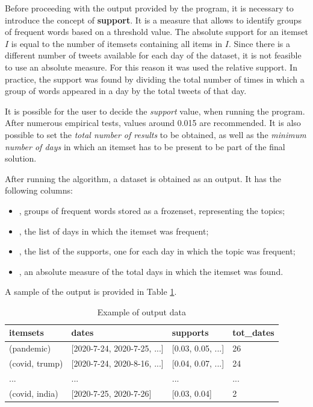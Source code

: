 Before proceeding with the output provided by the program, it is necessary to introduce the concept of \textbf{support}. It is a measure that allows to identify groups of frequent words based on a threshold value. The absolute support for an itemset $I$ is equal to the number of itemsets containing all items in $I$. Since there is a different number of tweets available for each day of the dataset, it is not feasible to use an absolute measure. For this reason it was used the relative support. In practice, the support was found by dividing the total number of times in which a group of words appeared in a day by the total tweets of that day. 

It is possible for the user to decide the \textit{support} value, when running the program. After numerous empirical tests, values around 0.015 are recommended. It is also possible to set the \textit{total number of results} to be obtained, as well as the \textit{minimum number of days} in which an itemset has to be present to be part of the final solution.

After running the algorithm, a dataset is obtained as an output. It has the following columns:

\begin{itemize}
  \item {}, groups of frequent words stored as a frozenset, representing the topics;
  \item {}, the list of days in which the itemset was frequent;
  \item {}, the list of the supports, one for each day in which the topic was frequent;
  \item {}, an absolute measure of the total days in which the itemset was found.
\end{itemize}

A sample of the output is provided in Table \ref{tab_output}.

\begin{table}[h]
  \centering
  \small
  \tabcolsep=0.14cm
  \begin{tabular}{@{}llll@{}}
  \toprule
  \textbf{itemsets}         & \textbf{dates}                     & \textbf{supports}      & \textbf{tot\_dates}  \\ \midrule
  (pandemic)                & {[}2020-7-24, 2020-7-25, ...{]}    & {[}0.03, 0.05, ...{]}  & 26                   \\
  (covid, trump)            & {[}2020-7-24, 2020-8-16, ...{]}    & {[}0.04, 0.07, ...{]}  & 24                   \\
  ...                       & ...                                & ...                    & ...                  \\
  (covid, india)          & {[}2020-7-25, 2020-7-26{]}           & {[}0.03, 0.04{]}       & 2                    \\ \bottomrule
  \end{tabular}
  \caption{Example of output data \label{tab_output}}
\end{table}

